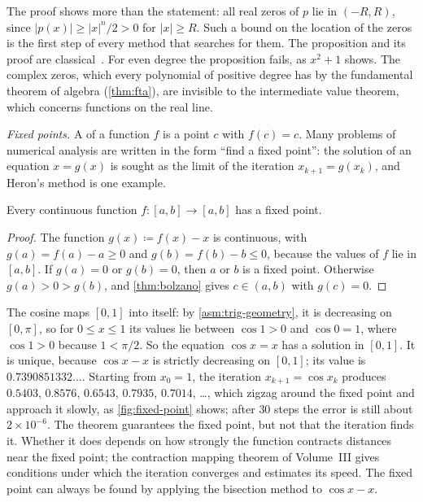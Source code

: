 The proof shows more than the statement: all real zeros of $p$ lie in $(-R,R)$, since $|p(x)|\ge|x|^n/2>0$ for $|x|\ge R$. Such a bound on the location of the zeros is the first step of every method that searches for them. The proposition and its proof are classical~\cite{spivak2008calculus}. For even degree the proposition fails, as $x^2+1$ shows. The complex zeros, which every polynomial of positive degree has by the fundamental theorem of algebra (\cref{thm:fta}), are invisible to the intermediate value theorem, which concerns functions on the real line.

\emph{Fixed points.} A  of a function $f$ is a point $c$ with $f(c)=c$. Many problems of numerical analysis are written in the form ``find a fixed point'': the solution of an equation $x=g(x)$ is sought as the limit of the iteration $x_{k+1}=g(x_k)$, and Heron's method is one example.

\begin{theorem}
\label{thm:fixed-point}
Every continuous function $f\colon[a,b]\to[a,b]$ has a fixed point.
\end{theorem}

\begin{proof}
The function $g(x)\coloneqq f(x)-x$ is continuous, with $g(a)=f(a)-a\ge0$ and $g(b)=f(b)-b\le0$, because the values of $f$ lie in $[a,b]$. If $g(a)=0$ or $g(b)=0$, then $a$ or $b$ is a fixed point. Otherwise $g(a)>0>g(b)$, and \cref{thm:bolzano} gives $c\in(a,b)$ with $g(c)=0$.
\end{proof}

The cosine maps $[0,1]$ into itself: by \cref{asm:trig-geometry}, it is decreasing on $[0,\pi]$, so for $0\le x\le1$ its values lie between $\cos1>0$ and $\cos0=1$, where $\cos1>0$ because $1<\pi/2$. So the equation $\cos x=x$ has a solution in $[0,1]$. It is unique, because $\cos x-x$ is strictly decreasing on $[0,1]$; its value is $0.7390851332\ldots$. Starting from $x_0=1$, the iteration $x_{k+1}=\cos x_k$ produces $0.5403$, $0.8576$, $0.6543$, $0.7935$, $0.7014$, \ldots, which zigzag around the fixed point and approach it slowly, as \cref{fig:fixed-point} shows; after $30$ steps the error is still about $2\times10^{-6}$. The theorem guarantees the fixed point, but not that the iteration finds it. Whether it does depends on how strongly the function contracts distances near the fixed point; the contraction mapping theorem of Volume~III gives conditions under which the iteration converges and estimates its speed. The fixed point can always be found by applying the bisection method to $\cos x-x$.

